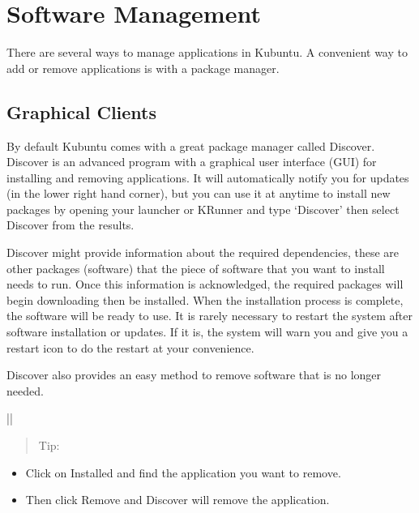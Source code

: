 \documentclass[letterpaper,10pt,english]{sphinxmanual}
\begin{document}
\section{Software Management}
\label{\detokenize{docs/software:software-management}}
\sphinxAtStartPar
There are several ways to manage applications in Kubuntu. A convenient way to add or remove applications is with a package manager.


\subsection{Graphical Clients}
\label{\detokenize{docs/software:graphical-clients}}
\sphinxAtStartPar
By default Kubuntu comes with a great package manager called Discover. Discover is an advanced program with a graphical user interface (GUI) for installing and removing applications. It will automatically notify you for updates (in the lower right hand corner), but you can use it at anytime to install new packages by opening your launcher or KRunner and type ‘Discover’ then select  Discover from the results.

\noindent{}

\sphinxAtStartPar
Discover might provide information about the required dependencies, these are other packages (software) that the piece of software that you want to install needs to run. Once this information is acknowledged, the required packages will begin downloading then be installed. When the installation process is complete, the software will be ready to use. It is rarely necessary to restart the system after software installation or updates. If it is, the system will warn you and give you a restart icon to do the restart at your convenience.

\sphinxAtStartPar
Discover also provides an easy method to remove software that is no longer needed.


\begin{savenotes}\sphinxattablestart
\centering
\begin{tabular}[t]{|*{1}{|}}
\hline
\begin{quote}

\sphinxAtStartPar
Tip:
\end{quote}
\begin{itemize}
\item {} 
\sphinxAtStartPar
Click on Installed and find the application you want to remove.

\item {} 
\sphinxAtStartPar
Then click Remove and Discover will remove the application.

\end{itemize}
\\
\hline
\end{tabular}
\par
\sphinxattableend\end{savenotes}
\end{document}
